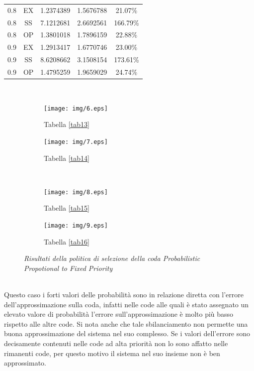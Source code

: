 \documentclass[12pt,a4paper,italian]{article}
\begin{document}
\begin{table}[ht!]
\begin{minipage}[b]{0.48\linewidth}
\begin{tabular}{c c c c c}
			 0.8 & EX & 1.2374389 &   1.5676788    & 21.07\%  \\
			 0.8 & SS & 7.1212681 &   2.6692561    & 166.79\% \\
			 0.8 & OP & 1.3801018 &   1.7896159    & 22.88\%  \\ \hline \hline
			 0.9 & EX & 1.2913417 &   1.6770746    & 23.00\%  \\
			 0.9 & SS & 8.6208662 &   3.1508154    & 173.61\% \\
			 0.9 & OP & 1.4795259 &   1.9659029    & 24.74\%  \\\hline
			
		\end{tabular}
		
	\end{minipage}
\end{table}
\ \ \
\newpage
\begin{figure}[ht!]
	\begin{subfigure}{.5\textwidth}
		\centering
		\texttt{[image: img/6.eps]}
		\caption{Tabella \ref{tab13}}
	\end{subfigure}
	\begin{subfigure}{.5\textwidth}
		\centering
		\texttt{[image: img/7.eps]}
		\caption{Tabella \ref{tab14}}
	\end{subfigure}\\
		\begin{subfigure}{.5\textwidth}
			\centering
			\texttt{[image: img/8.eps]}
			\caption{Tabella \ref{tab15}}
		\end{subfigure}
		\begin{subfigure}{.5\textwidth}
			\centering
			\texttt{[image: img/9.eps]}
			\caption{Tabella \ref{tab16}}
		\end{subfigure}
		\caption{\emph{Risultati della politica di selezione della coda Probabilistic Propotional to Fixed Priority}}
\end{figure}
\ \\
Questo caso i forti valori delle probabilità sono in relazione diretta con l'errore dell'approssimazione sulla coda, infatti nelle code alle quali è stato assegnato un elevato valore di probabilità l'errore sull'approssimazione è molto più basso rispetto alle altre code. Si nota anche che tale sbilanciamento non permette una buona approssimazione del sistema nel suo complesso. Se i valori dell'errore sono decisamente contenuti nelle code ad alta priorità non lo sono affatto nelle rimanenti code, per questo motivo il sistema nel suo insieme non è ben approssimato.
\newpage
\end{document}
